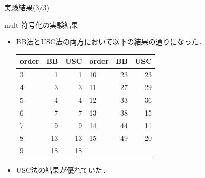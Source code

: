 \documentclass[dvipdfmx,11pt]{beamer}
\begin{document}
\begin{frame}{実験結果(3/3)}
 \begin{block}{mult}
  符号化の実験結果
  \begin{itemize}
   \item BB法とUSC法の両方において以下の結果の通りになった．
         \begin{table}
          \begin{tabular}{l|r|r||l|r|r}
           \hline
           order & BB & USC & order & BB & USC \\
           \hline
           3  & \alert{1}   & \alert{1}    & 10 & 23         & \alert{23}  \\
           4  & \alert{3}   & \alert{3}    & 11 & 27         & \alert{29}  \\
           5  & \alert{4}   & \alert{4}    & 12 & 33         & \alert{36}  \\
           6  & \alert{7}   & \alert{7}    & 13 & 38         & 15          \\
           7  & \alert{9}   & \alert{9}    & 14 & 44         & 11          \\
           8  & \alert{13}  & \alert{13}   & 15 & 49         & 20          \\
           9  & \alert{18}  & \alert{18}   \\
           \hline
          \end{tabular}
         \end{table}
   \item USC法の結果が優れていた．
  \end{itemize}
 \end{block}
\end{frame}

\end{document}
